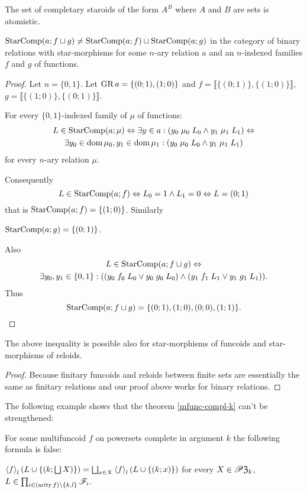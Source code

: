 \begin{conjecture}
The set of completary staroids of the form $A^{B}$ where $A$ and
$B$ are sets is atomistic.\end{conjecture}
\begin{example}
$\operatorname{StarComp}(a;f\sqcup g)\neq\operatorname{StarComp}(a;f)\sqcup\operatorname{StarComp}(a;g)$ in
the category of binary relations with star-morphisms for some $n$-ary
relation $a$ and an $n$-indexed families $f$ and $g$ of functions.\end{example}
\begin{proof}
Let $n=\{0,1\}$. Let $\operatorname{GR} a=\{(0;1),(1;0)\}$ and $f=\llbracket\{(0;1)\},\{(1;0)\}\rrbracket$,
$g=\llbracket\{(1;0)\},\{(0;1)\}\rrbracket$.

For every $\{0,1\}$-indexed family of $\mu$ of functions:
\begin{multline*}
L\in\operatorname{StarComp}(a;\mu)\Leftrightarrow\exists y\in a:(y_{0}\mathrel{\mu_{0}}L_{0}\wedge y_{1}\mathrel{\mu_{1}}L_{1})\Leftrightarrow\\
\exists y_{0}\in\operatorname{dom}\mu_{0},y_{1}\in\operatorname{dom}\mu_{1}:(y_{0}\mathrel{\mu_{0}}L_{0}\wedge y_{1}\mathrel{\mu_{1}}L_{1})
\end{multline*}
 for every $n$-ary relation $\mu$.

Consequently 
\[
L\in\operatorname{StarComp}(a;f)\Leftrightarrow L_{0}=1\wedge L_{1}=0\Leftrightarrow L=(0;1)
\]
that is $\operatorname{StarComp}(a;f)=\{(1;0)\}$. Similarly

$\operatorname{StarComp}(a;g)=\{(0;1)\}$.

Also 
\begin{multline*}
L\in\operatorname{StarComp}(a;f\sqcup g)\Leftrightarrow\\
\exists y_{0},y_{1}\in\{0,1\}:((y_{0}\mathrel{f_{0}}L_{0}\vee y_{0}\mathrel{g_{0}}L_{0})\wedge(y_{1}\mathrel{f_{1}}L_{1}\vee y_{1}\mathrel{g_{1}}L_{1})).
\end{multline*}
Thus 
\[
\operatorname{StarComp}(a;f\sqcup g)=\{(0;1),(1;0),(0;0),(1;1)\}.
\]
\end{proof}
\begin{cor}
The above inequality is possible also for star-morphisms of funcoids
and star-morphisms of reloids.\end{cor}
\begin{proof}
Because finitary funcoids and reloids between finite sets are essentially
the same as finitary relations and our proof above works for binary
relations.
\end{proof}
The following example shows that the theorem \ref{mfunc-compl-k}
can't be strengthened:
\begin{example}
For some multifuncoid $f$ on powersets complete in argument $k$
the following formula is false:

$\left\langle f\right\rangle_{l}\left(L\cup\left\{ \left(k;\bigsqcup X\right)\right\} \right)=\bigsqcup_{x\in X}\left\langle f\right\rangle_{l}(L\cup\{(k;x)\})$
for every $X\in\mathscr{P}\mathfrak{Z}_{k}$, $L\in\prod_{i\in(\operatorname{arity} f)\setminus\{k,l\}}\mathscr{F}_{i}$.\end{example}
